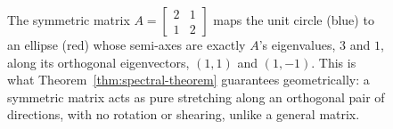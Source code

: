 		\begin{figure}[h]
			\centering
			\caption{The symmetric matrix $A=\begin{bmatrix}2&1\\1&2\end{bmatrix}$ maps the unit circle (blue) to an ellipse (red) whose semi-axes are exactly $A$'s eigenvalues, $3$ and $1$, along its orthogonal eigenvectors, $(1,1)$ and $(1,-1)$. This is what Theorem~\ref{thm:spectral-theorem} guarantees geometrically: a symmetric matrix acts as pure stretching along an orthogonal pair of directions, with no rotation or shearing, unlike a general matrix.}
			\label{fig:spectral-theorem}
		\end{figure}
		
